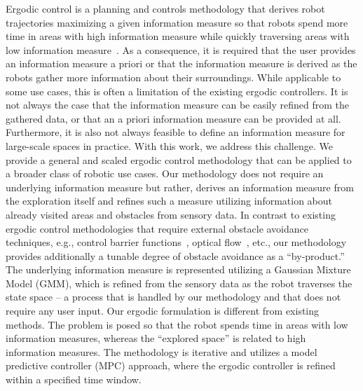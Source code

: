 \documentclass[letterpaper,10pt,conference,twoside]{IEEEtran}
\theoremstyle{definition}
\begin{document}
Ergodic control is a planning and controls methodology that derives robot trajectories maximizing a given information measure so that robots spend more time in areas with high information measure while quickly traversing areas with low information measure~\cite{mathew2011metrics,abraham2017ergodic,miller2013trajectory}. As a consequence, it is required that the user provides an information measure a priori or that the information measure is derived as the robots gather more information about their surroundings. While applicable to some use cases, this is often a limitation of the existing ergodic controllers. It is not always the case that the information measure can be easily refined from the gathered data, or that an a priori information measure can be provided at all. Furthermore, it is also not always feasible to define an information measure for large-scale spaces in practice. With this work, we address this challenge. We provide a general and scaled ergodic control methodology that can be applied to a broader class of robotic use cases. Our methodology does not require an underlying information measure but rather, derives an information measure from the exploration itself and refines such a measure utilizing information about already visited areas and obstacles from sensory data. 
In contrast to existing ergodic control methodologies that require external obstacle avoidance techniques, e.g., control barrier functions~\cite{lerch2023safety}, optical flow~\cite{prabhakar2020ergodic}, etc., our methodology provides additionally a tunable degree of obstacle avoidance as a ``by-product.'' 
%
The underlying information measure is represented utilizing a Gaussian Mixture Model (GMM), which is refined from the sensory data as the robot traverses the state space -- a process that is handled by our methodology and that does not require any user input. Our ergodic formulation is different from existing methods. The problem is posed so that the robot spends time in areas with low information measures, whereas the ``explored space'' is related to high information measures. The methodology is iterative and utilizes a model predictive controller (MPC) approach, where the ergodic controller is refined within a specified time window.
\end{document}
